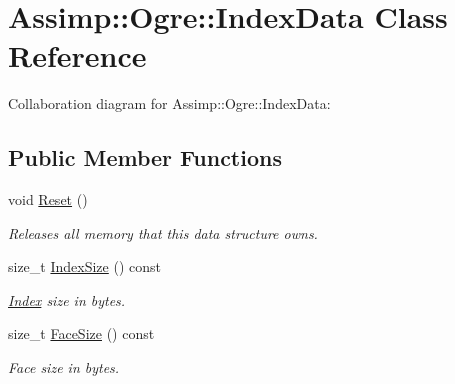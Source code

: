 \hypertarget{class_assimp_1_1_ogre_1_1_index_data}{\section{Assimp\+:\+:Ogre\+:\+:Index\+Data Class Reference}
\label{class_assimp_1_1_ogre_1_1_index_data}
}


Collaboration diagram for Assimp\+:\+:Ogre\+:\+:Index\+Data\+:
\subsection*{Public Member Functions}
\begin{DoxyCompactItemize}
\item 
\hypertarget{class_assimp_1_1_ogre_1_1_index_data_af9c474f0d58e775e759fb9e58e128eb5}{void \hyperlink{class_assimp_1_1_ogre_1_1_index_data_af9c474f0d58e775e759fb9e58e128eb5}{Reset} ()}\label{class_assimp_1_1_ogre_1_1_index_data_af9c474f0d58e775e759fb9e58e128eb5}

\begin{DoxyCompactList}\small\item\em Releases all memory that this data structure owns. \end{DoxyCompactList}\item 
\hypertarget{class_assimp_1_1_ogre_1_1_index_data_a54f2e438f19636b060b7cfce6b3472fd}{size\+\_\+t \hyperlink{class_assimp_1_1_ogre_1_1_index_data_a54f2e438f19636b060b7cfce6b3472fd}{Index\+Size} () const }\label{class_assimp_1_1_ogre_1_1_index_data_a54f2e438f19636b060b7cfce6b3472fd}

\begin{DoxyCompactList}\small\item\em \hyperlink{struct_index}{Index} size in bytes. \end{DoxyCompactList}\item 
\hypertarget{class_assimp_1_1_ogre_1_1_index_data_a06f8f7c96d734ed2bdcee2e2e8dcd193}{size\+\_\+t \hyperlink{class_assimp_1_1_ogre_1_1_index_data_a06f8f7c96d734ed2bdcee2e2e8dcd193}{Face\+Size} () const }\label{class_assimp_1_1_ogre_1_1_index_data_a06f8f7c96d734ed2bdcee2e2e8dcd193}

\begin{DoxyCompactList}\small\item\em Face size in bytes. \end{DoxyCompactList}\end{DoxyCompactItemize}
